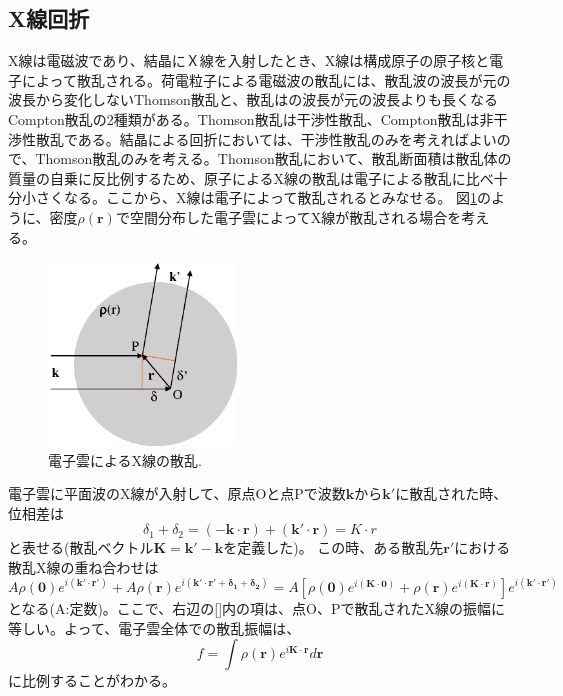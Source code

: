 \documentclass[11pt,a4j,uplatex]{jsarticle}
\begin{document}
\newpage
\subsection{X線回折}%
X線は電磁波であり、結晶にＸ線を入射したとき、X線は構成原子の原子核と電子によって散乱される。荷電粒子による電磁波の散乱には、散乱波の波長が元の波長から変化しないThomson散乱と、散乱はの波長が元の波長よりも長くなるCompton散乱の2種類がある。Thomson散乱は干渉性散乱、Compton散乱は非干渉性散乱である。結晶による回折においては、干渉性散乱のみを考えればよいので、Thomson散乱のみを考える。Thomson散乱において、散乱断面積は散乱体の質量の自乗に反比例するため、原子によるX線の散乱は電子による散乱に比べ十分小さくなる。ここから、X線は電子によって散乱されるとみなせる。
図\ref{sanran}のように、密度$\rho(\bm{r})$で空間分布した電子雲によってX線が散乱される場合を考える。
\begin{figure}[htb]
 \centering
 \includegraphics[clip,width=5cm]{sanran.eps}
 \caption{電子雲によるX線の散乱.}
 \label{sanran}
\end{figure}

電子雲に平面波のX線が入射して、原点Oと点Pで波数$\bm{k}$から$\bm{k}'$に散乱された時、位相差は
\begin{equation}
  \delta_1+\delta_2=\bm{(-k\cdot r)+(k'\cdot r)}=K\cdot r
\end{equation}
と表せる(散乱ベクトル$\bm{K=k'-k}$を定義した)。
この時、ある散乱先$\bm{r'}$における散乱X線の重ね合わせは
\begin{equation}
  A\rho\bm{(0)}e^{i(\bm{k'\cdot r'})}+  A\rho\bm{(r)}e^{i(\bm{k'\cdot r'+\delta_1+\delta_2})}=A[\rho\bm{(0)}e^{i(\bm{K\cdot 0})}+\rho\bm{(r)}e^{i(\bm{K\cdot r})}]e^{i(\bm{k'\cdot r'})}
\end{equation}
となる(A:定数)。ここで、右辺の[]内の項は、点O、Pで散乱されたX線の振幅に等しい。よって、電子雲全体での散乱振幅は、
\begin{equation}
  f=\int\rho(\bm{r})e^{i\bm{K\cdot r}}d\bm{r}
  \label{insi}
\end{equation}
に比例することがわかる。
\end{document}
